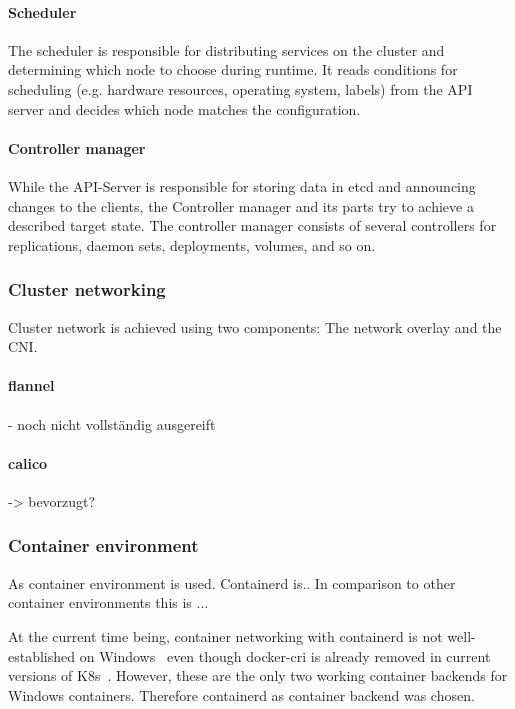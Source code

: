 \paragraph{Scheduler} The scheduler is responsible for distributing services on the cluster and determining which node to choose during runtime. It reads conditions for scheduling (e.g. hardware resources, operating system, labels) from the API server and decides which node matches the configuration\cite{Luksa.2018}.

\paragraph{Controller manager} While the API-Server is responsible for storing data in etcd and announcing changes to the clients, the Controller manager and its parts try to achieve a described target state\cite{Luksa.2018}. The controller manager consists of several controllers for replications, daemon sets, deployments, volumes, and so on.


\subsubsection{Cluster networking}
Cluster network is achieved using two components: The network overlay and the \ac{CNI}.


\paragraph{flannel}
- noch nicht vollständig ausgereift

\paragraph{calico}
-> bevorzugt?

\subsubsection{Container environment}
As container environment  is used. Containerd is..
In comparison to other container environments this is ...

At the current time being, container networking with containerd is not well-established on Windows~\cite{GitHub.20230202,GitHub.20230202b,Github.2022_258,GitHub.20230202c} even though docker-cri is already removed in current versions of \ac{K8s}~\cite{Kubernetes.2020}. However, these are the only two working container backends for Windows containers. Therefore containerd as container backend was chosen.

